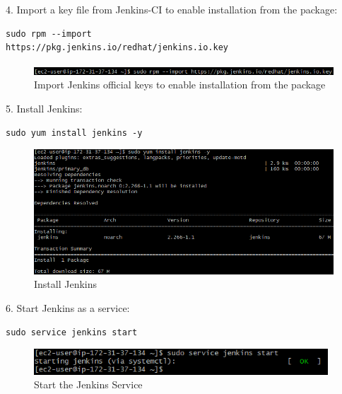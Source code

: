 \documentclass[12pt,a4paper,twoside]{article}
\begin{document}
4. Import a key file from Jenkins-CI to enable installation from the package:


\begin{verbatim}
sudo rpm --import
https://pkg.jenkins.io/redhat/jenkins.io.key
\end{verbatim}


\begin{figure}[H]
    \centering
        \includegraphics[width=15cm]{images-aws/17-import-jenkins-keys.png}
        \caption{Import Jenkins official keys to enable installation from the package}
\end{figure}


5. Install Jenkins:


\begin{verbatim}
sudo yum install jenkins -y
\end{verbatim}


\begin{figure}[H]
    \centering
        \includegraphics[width=15cm]{images-aws/18-install-jenkins.png}
        \caption{Install Jenkins}
\end{figure}


6. Start Jenkins as a service:


\begin{verbatim}
sudo service jenkins start
\end{verbatim}


\begin{figure}[H]
    \centering
        \includegraphics[width=11cm]{images-aws/19-start-jenkins.png}
        \caption{Start the Jenkins Service}
\end{figure}



\newpage
\end{document}
